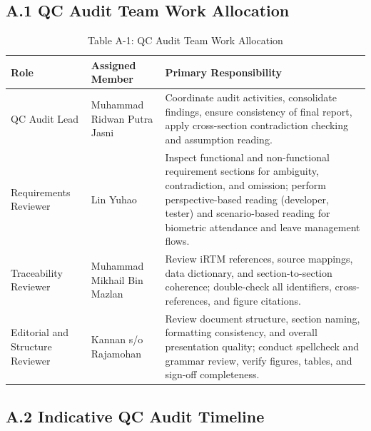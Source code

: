 \documentclass[11pt,a4paper]{article}
\begin{document}
\subsection*{A.1 QC Audit Team Work Allocation}

\begin{table}[H]
\centering
\small
\renewcommand{\arraystretch}{1.4}
\begin{tabularx}{\textwidth}{|p{}|p{}|X|}
\hline
\rowcolor{tableheader}
\textbf{Role} & \textbf{Assigned Member} & \textbf{Primary Responsibility} \\
\hline
QC Audit Lead & Muhammad Ridwan Putra Jasni & Coordinate audit activities, consolidate findings, ensure consistency of final report, apply cross-section contradiction checking and assumption reading. \\
\hline
Requirements Reviewer & Lin Yuhao & Inspect functional and non-functional requirement sections for ambiguity, contradiction, and omission; perform perspective-based reading (developer, tester) and scenario-based reading for biometric attendance and leave management flows. \\
\hline
Traceability Reviewer & Muhammad Mikhail Bin Mazlan & Review iRTM references, source mappings, data dictionary, and section-to-section coherence; double-check all identifiers, cross-references, and figure citations. \\
\hline
Editorial and Structure Reviewer & Kannan s/o Rajamohan & Review document structure, section naming, formatting consistency, and overall presentation quality; conduct spellcheck and grammar review, verify figures, tables, and sign-off completeness. \\
\hline
\end{tabularx}
\caption*{Table A-1: QC Audit Team Work Allocation}
\label{tab:qc-wbs}
\end{table}

\subsection*{A.2 Indicative QC Audit Timeline}
\end{document}
